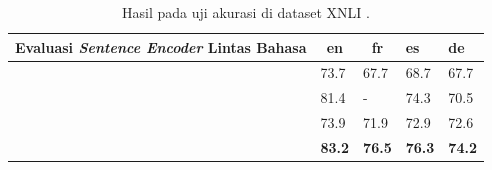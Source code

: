 \begin{table}[!h]
    \centering
    \caption{Hasil pada uji akurasi di dataset XNLI \parencite{LampleConneau2019}.}
    \begin{tabular}{|l|l|l|l|l|}
    \hline
    \multicolumn{1}{|c|}{\textbf{Evaluasi \textit{Sentence Encoder} Lintas Bahasa}} & \multicolumn{1}{c|}{\textbf{en}} & \multicolumn{1}{c|}{\textbf{fr}} & \textbf{es}   & \textbf{de}   \\ \hline
    \parencite{LamplePhrase2018}                            & 73.7                             & 67.7                             & 68.7          & 67.7          \\ \hline
    \parencite{Devlin_Chang_Lee_Toutanova_2019}         & 81.4                             & -                                & 74.3          & 70.5          \\ \hline
    \parencite{Artetxe_Schwenk_2019}                      & 73.9                             & 71.9                             & 72.9          & 72.6          \\ \hline
    \parencite{LampleConneau2019}                           & \textbf{83.2}                    & \textbf{76.5}                    & \textbf{76.3} & \textbf{74.2} \\ \hline
    \end{tabular}
    \label{tab:LampleConneau2019}
\end{table}

